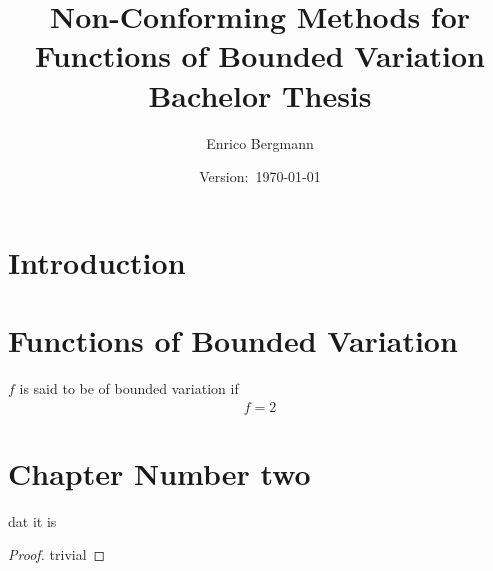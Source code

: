 \documentclass[draft=false,12pt]{scrreprt}
\title{Non-Conforming Methods for Functions of Bounded Variation\\
Bachelor Thesis}
\author{Enrico Bergmann}
\date{Version:~\today}
\begin{document}
\maketitle
\tableofcontents

\chapter{Introduction}


\chapter{Functions of Bounded Variation}

\begin{definition}
 $f$ is said to be of bounded variation if 
 \begin{align*}
   f=2
 \end{align*}
\end{definition}

\chapter{Chapter Number two}

\begin{theorem}
  dat it is
\end{theorem}

\begin{proof}
  trivial
\end{proof}
\end{document}
